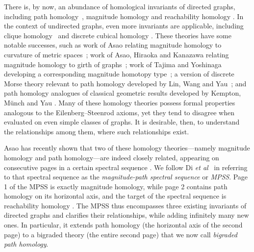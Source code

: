 \documentclass[a4paper, 11 pt, oneside, reqno]{amsart}
\numberwithin{lemma}{section}
\theoremstyle{definition}
\begin{document}
There is, by now, an abundance of homological invariants of directed graphs, including path homology~\cite{GLMY2013,PH-homotopy}, magnitude homology \cite{HepworthWillerton2017} and reachability homology \cite{HepworthRoff2023}. In the context of undirected graphs, even more invariants are applicable, including clique homology~\cite{DeMeyerDeMeyer, PetriEtAl} and discrete cubical homology \cite{Barcelo-etal-2014}. 
These theories have some notable successes,
such as work of Asao relating magnitude homology to curvature of metric spaces~\cite{Asao-curvature};
work of Asao, Hiraoka and Kanazawa relating magnitude homology to girth of graphs~\cite{Asao-curvature,AsaoGirth};
work of Tajima and Yoshinaga developing a corresponding
magnitude homotopy type~\cite{TajimaYoshinaga};
a version of discrete Morse theory relevant to path homology developed by Lin, Wang and Yau~\cite{PH-discretemorse};
and path homology analogues of classical geometric results developed by Kempton, M\"unch and Yau \cite{PH-curvature}.
Many of these homology theories possess formal properties analogous to the Eilenberg--Steenrod axioms, yet they tend to disagree when evaluated on even simple classes of graphs. It is desirable, then, to understand the relationships among them, where such relationships exist.

Asao has recently shown that two of these homology theories---namely magnitude homology and path homology---are indeed closely related, appearing on consecutive pages in a certain spectral sequence \cite{Asao-path}. We follow Di \emph{et al}~\cite{DIMZ} in referring to that spectral sequence as the \emph{magnitude-path spectral sequence} or \emph{MPSS}. Page 1 of the MPSS is exactly magnitude homology, while page 2 contains path homology on its horizontal axis, and the target of the spectral sequence is reachability homology \cite{HepworthRoff2023}. The MPSS thus encompasses three existing invariants of directed graphs and clarifies their relationships, while adding infinitely many new ones. In particular, it extends path homology (the horizontal axis of the second page) to a bigraded theory (the entire second page) that we now call \emph{bigraded path homology}.
\end{document}
